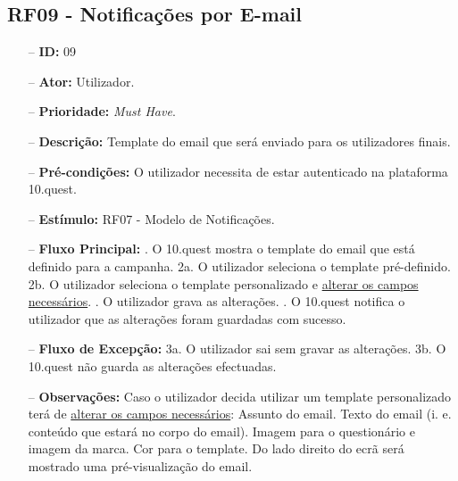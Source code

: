 \subsection{RF09 - Notificações por E-mail}
\begin{itemize}
	\item[--] \textbf{ID:} 09
	\item[--]  \textbf{Ator:} Utilizador.
	\item[--]  \textbf{Prioridade:} \textit{Must Have}.
	\item[--]  \textbf{Descrição:} Template do email que será enviado para os utilizadores finais.
	\item[--]  \textbf{Pré-condições:} O utilizador necessita de estar autenticado na plataforma 10.quest.
	\item[--]  \textbf{Estímulo:} RF07 - Modelo de Notificações.
	\item[--]  \textbf{Fluxo Principal:} 
	. O 10.quest mostra o template do email que está definido para a campanha.
	\subitem 2a. O utilizador seleciona o template pré-definido.
	\subitem 2b. O utilizador seleciona o template personalizado e \underline{alterar os campos necessários}.
	. O utilizador grava as alterações.
	. O 10.quest notifica o utilizador que as alterações foram guardadas com sucesso.
	\item[--]  \textbf{Fluxo de Excepção:} 
	\subitem 3a. O utilizador sai sem gravar as alterações.
	\subitem 3b. O 10.quest não guarda as alterações efectuadas.
	\item[--]  \textbf{Observações:} Caso o utilizador decida utilizar um template personalizado terá de \underline{alterar os campos necessários}:
		\subitem Assunto do email.
		\subitem Texto do email (i. e. conteúdo que estará no corpo do email).
		\subitem Imagem para o questionário e imagem da marca.
		\subitem Cor para o template.
	Do lado direito do ecrã será mostrado uma pré-visualização do email.
\end{itemize}
\newpage

